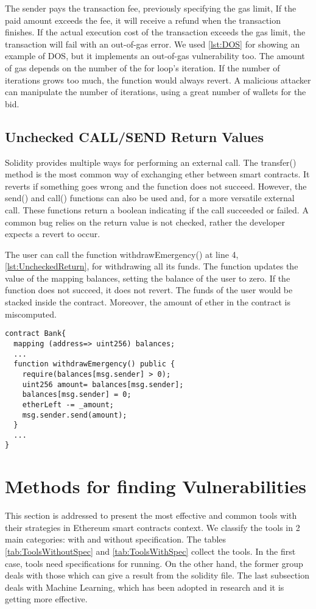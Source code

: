 \documentclass[a4paper,sigconf, language=french,
language=german, language=spanish, language=english]{acmart}
\begin{document}
The sender pays the transaction fee, previously specifying the gas limit, If the paid amount exceeds the fee, it will receive a refund when the transaction finishes. 
If the actual execution cost of the transaction exceeds the gas limit, the transaction will fail with an out-of-gas error. 
We used \autoref{lst:DOS} for showing an example of DOS, but it implements an out-of-gas vulnerability too. 
The amount of gas depends on the number of the for loop's iteration. If the number of iterations grows too much, the function would always revert. A malicious attacker can 
manipulate the number of iterations, using a great number of wallets for the bid.

\subsection{Unchecked CALL/SEND Return Values} 
Solidity provides multiple ways for performing an external call. 
The transfer() method is the most common way of exchanging ether between smart contracts. 
It reverts if something goes wrong and the function does not succeed. However, the send() and call() functions can also be used and, for a more versatile external call. 
These functions return a boolean indicating if the call succeeded or failed.  A common bug relies on the return value is not checked, rather the developer expects a revert to occur. 

The user can call the function withdrawEmergency()  at line 4, \autoref{lst:UncheckedReturn}, for withdrawing all its funds. The function updates the value of the mapping balances, setting 
the balance of the user to zero. If the function does not succeed, it does not revert. 
The funds of the user would be stacked inside the contract. Moreover, the amount of ether in the contract is miscomputed.

\begin{lstlisting}[language=Solidity,caption={Unchecked CALL/SEND Return Values},label={lst:UncheckedReturn}]
contract Bank{
  mapping (address=> uint256) balances;
  ... 
  function withdrawEmergency() public {
    require(balances[msg.sender] > 0);
    uint256 amount= balances[msg.sender];
    balances[msg.sender] = 0;
    etherLeft -= _amount;
    msg.sender.send(amount);
  }
  ...
}

\end{lstlisting}

\section{Methods for finding Vulnerabilities}
\label{MethodologiesForTools}
This section is addressed to present the most effective and common tools with their strategies in Ethereum smart contracts context. 
We classify the tools in 2 main categories: with and without specification. The tables \ref{tab:ToolsWithoutSpec} and \ref{tab:ToolsWithSpec} collect the tools. 
In the first case, tools need specifications for running. On the other hand,  the former group 
deals with those which can give a result from the solidity file.
The last subsection deals with Machine Learning, which has been adopted in research and it is getting more effective.
\end{document}
